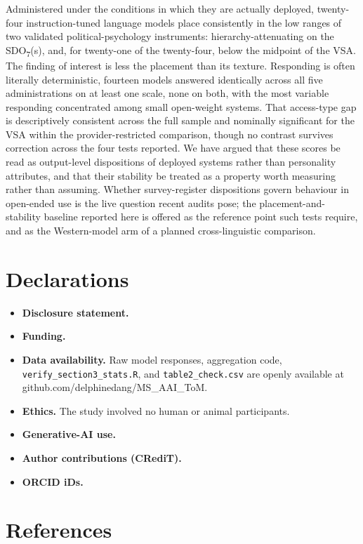 \documentclass[
]{article}
\newcounter{none} %
\providecommand{\tightlist}{%
  \setlength{\itemsep}{0pt}\setlength{\parskip}{0pt}}
\begin{document}
Administered under the conditions in which they are actually deployed,
twenty-four instruction-tuned language models place consistently in the
low ranges of two validated political-psychology instruments:
hierarchy-attenuating on the SDO\textsubscript{7}(s), and, for
twenty-one of the twenty-four, below the midpoint of the VSA. The
finding of interest is less the placement than its texture. Responding
is often literally deterministic, fourteen models answered identically
across all five administrations on at least one scale, none on both,
with the most variable responding concentrated among small open-weight
systems. That access-type gap is descriptively consistent across the
full sample and nominally significant for the VSA within the
provider-restricted comparison, though no contrast survives correction
across the four tests reported. We have argued that these scores be read
as output-level dispositions of deployed systems rather than personality
attributes, and that their stability be treated as a property worth
measuring rather than assuming. Whether survey-register dispositions
govern behaviour in open-ended use is the live question recent audits
pose; the placement-and-stability baseline reported here is offered as
the reference point such tests require, and as the Western-model arm of
a planned cross-linguistic comparison.

\section*{Declarations}\label{declarations}

\begin{itemize}
\tightlist
\item
  \textbf{Disclosure statement.}
\item
  \textbf{Funding.}
\item
  \textbf{Data availability.} Raw model responses, aggregation code,
  \texttt{verify\_section3\_stats.R}, and \texttt{table2\_check.csv} are
  openly available at github.com/delphinedang/MS\_AAI\_ToM.
\item
  \textbf{Ethics.} The study involved no human or animal participants.
\item
  \textbf{Generative-AI use.}
\item
  \textbf{Author contributions (CRediT).}
\item
  \textbf{ORCID iDs.}
\end{itemize}

\section*{References}\label{references}
\end{document}
